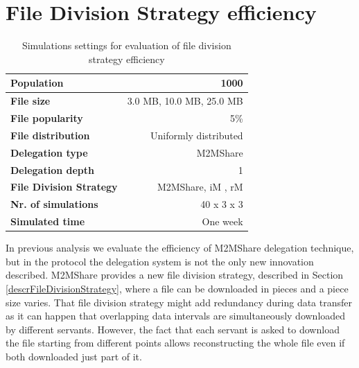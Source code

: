 
\newpage 
\section{File Division Strategy efficiency}
\begin{table}[h]
\begin{center}
\begin{tabular}{|l|r|}
\hline
\bfseries Population & 1000 \\
\hline
\bfseries File size & 3.0 MB, 10.0 MB, 25.0 MB \\
\hline
\bfseries File popularity & 5\% \\
\hline
\bfseries File distribution & Uniformly distributed \\
\hline
\bfseries Delegation type & M2MShare \\
\hline
\bfseries Delegation depth & 1 \\
\hline
\bfseries File Division Strategy & M2MShare, iM , rM \\
\hline
\bfseries Nr. of simulations & 40 x 3 x 3\\
\hline
\bfseries Simulated time & One week \\
\hline
\end{tabular}
\end{center}
\caption{Simulations settings for evaluation of file division strategy efficiency\label{tab:settingsFDS}}
\end{table}
In previous analysis we evaluate the efficiency of M2MShare delegation technique, but in the protocol the delegation system is not the only new innovation described. M2MShare provides a new file division strategy, described in Section \ref{descrFileDivisionStrategy}, where a file can be downloaded in pieces and a piece size varies. That file division strategy might add redundancy during data transfer as it can happen that overlapping data intervals are simultaneously downloaded by different servants. However, the fact that each servant is asked to download the file starting from different points allows reconstructing the whole file even if both downloaded just part of it. \\
